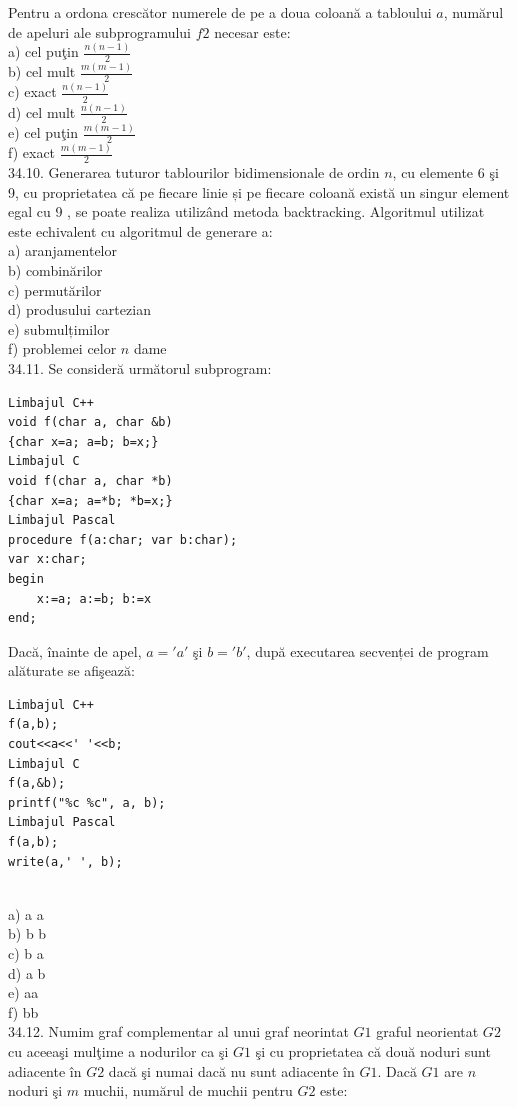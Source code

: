 \begin{itemize}
\begin{enumerate}
Pentru a ordona crescător numerele de pe a doua coloană a tabloului $a$, numărul de apeluri ale subprogramului $f2$ necesar este:
\\
a) cel puţin $\frac{n(n-1)}{2}$
\\
b) cel mult $\frac{m(m-1)}{2}$
\\
c) exact $\frac{n(n-1)}{2}$
\\
d) cel mult $\frac{n(n-1)}{2}$
\\
e) cel puţin $\frac{m(m-1)}{2}$
\\
f) exact $\frac{m(m-1)}{2}$
\\
34.10. Generarea tuturor tablourilor bidimensionale de ordin $n$, cu elemente 6 şi 9, cu proprietatea că pe fiecare linie și pe fiecare coloană există un singur element egal cu 9 , se poate realiza utilizând metoda backtracking. Algoritmul utilizat este echivalent cu algoritmul de generare a:
\\
a) aranjamentelor
\\
b) combinărilor
\\
c) permutărilor
\\
d) produsului cartezian
\\
e) submulțimilor
\\
f) problemei celor $n$ dame
\\
34.11. Se consideră următorul subprogram:
\begin{verbatim}
Limbajul C++
void f(char a, char &b)
{char x=a; a=b; b=x;}
Limbajul C
void f(char a, char *b)
{char x=a; a=*b; *b=x;}
Limbajul Pascal
procedure f(a:char; var b:char);
var x:char;
begin
    x:=a; a:=b; b:=x
end;
\end{verbatim}
Dacă, înainte de apel, $a='a'$ şi $b='b'$, după executarea secvenței de program alăturate se afişează:
\begin{verbatim}
Limbajul C++
f(a,b);
cout<<a<<' '<<b;
Limbajul C
f(a,&b);
printf("%c %c", a, b);
Limbajul Pascal
f(a,b);
write(a,' ', b);
\end{verbatim}
\\
a) a a
\\
b) b b
\\
c) b a
\\
d) a b
\\
e) aa
\\
f) bb
\\
34.12. Numim graf complementar al unui graf neorintat $G1$ graful neorientat $G2$ cu aceeaşi mulţime a nodurilor ca şi $G1$ şi cu proprietatea că două noduri sunt adiacente în $G2$ dacă şi numai dacă nu sunt adiacente în $G1$. Dacă $G1$ are $n$ noduri şi $m$ muchii, numărul de muchii pentru $G2$ este:

\end{enumerate}
\end{itemize}
